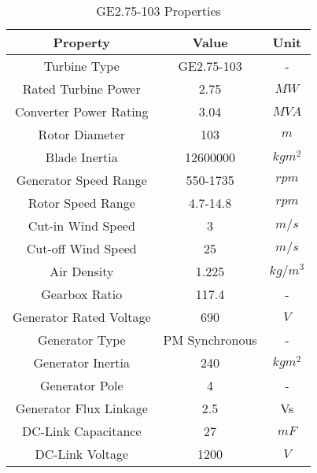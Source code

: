 \begin{table}[h!]
	
	\centering
	\begin{tabular}{ccc}
		\hline
		\textbf{Property}       & \textbf{Value} & \textbf{Unit} \\ \hline
		Turbine Type            & GE2.75-103     & -             \\
		Rated Turbine Power     & 2.75           & $MW$          \\
		Converter Power Rating  & 3.04           & $MVA$         \\
		Rotor Diameter          & 103            & $m$           \\
		Blade Inertia           & 12600000       & $kgm^{2}$     \\
		Generator Speed Range   & 550-1735       & $rpm$         \\
		Rotor Speed Range       & 4.7-14.8       & $rpm$         \\
		Cut-in Wind Speed       & 3              & $m/s$         \\
		Cut-off Wind Speed      & 25             & $m/s$         \\
		Air Density             & 1.225          & $kg/m^{3}$    \\
		Gearbox Ratio           & 117.4          & -             \\
		Generator Rated Voltage & 690            & $V$           \\
		Generator Type          & PM Synchronous & -             \\
		Generator Inertia       & 240            & $kgm^{2}$     \\
		Generator Pole          & 4              & -             \\
		Generator Flux Linkage  & 2.5            & Vs          \\
		DC-Link Capacitance     & 27             & $mF$          \\
		DC-Link Voltage         & 1200           & $V$           \\ \hline
	\end{tabular}
	\caption{GE2.75-103 Properties}
	\label{ge275}
\end{table}
